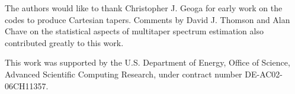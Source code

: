 
The authors would like to thank Christopher J. Geoga for early work on the codes to
produce Cartesian tapers. 
Comments by David J. Thomson and Alan Chave on the statistical aspects of
multitaper spectrum estimation also contributed greatly to this work. 

This work was supported by the U.S. Department of Energy, Office of Science, Advanced
Scientific Computing Research, under contract number DE-AC02-06CH11357.


